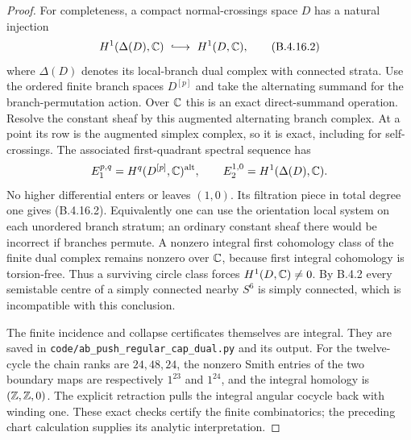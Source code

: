 \begin{proof}
For completeness, a compact normal-crossings space $D$
has a natural injection
\[
 H^1(\Delta(D),\C)\ \lhook\joinrel\longrightarrow\
 H^1(D,\C),
 \tag{B.4.16.2}
\]
where $\Delta(D)$ denotes its local-branch dual
complex with connected strata. Use the ordered finite
branch spaces $D^{[p]}$ and take the alternating
summand for the branch-permutation action. Over $\mathbb C$
this is an exact direct-summand operation. Resolve the
constant sheaf by this augmented alternating branch
complex. At a point its row is the augmented simplex
complex, so it is exact, including for self-crossings.
The associated first-quadrant spectral sequence has
\[
 E_1^{p,q}=H^q(D^{[p]},\mathbb C)^{\mathrm{alt}},
 \qquad
 E_2^{1,0}=H^1(\Delta(D),\mathbb C).
\]
No higher differential enters or leaves $(1,0)$.
Its filtration piece in total degree one gives
(B.4.16.2). Equivalently one can use the orientation
local system on each unordered branch stratum; an
ordinary constant sheaf there would be incorrect if
branches permute. A nonzero integral first cohomology
class of the finite dual complex remains nonzero over
$\mathbb C$, because first integral cohomology is torsion-free.
Thus a surviving circle class forces $H^1(D,\mathbb C)\ne0$.
By B.4.2 every semistable centre of
a simply connected nearby $S^6$ is simply connected,
which is incompatible with this conclusion.

The finite incidence and collapse certificates themselves
are integral. They are
saved in \texttt{code/ab\_push\_regular\_cap\_dual.py}
and its output. For the twelve-cycle the chain ranks
are $24,48,24$, the nonzero Smith entries of the two
boundary maps are respectively $1^{23}$ and $1^{24}$,
and the integral homology is $(\mathbb Z,\mathbb Z,0)$.
The explicit retraction pulls the integral angular
cocycle back with winding one. These exact checks
certify the finite combinatorics; the preceding chart
calculation supplies its analytic interpretation.
\end{proof}
